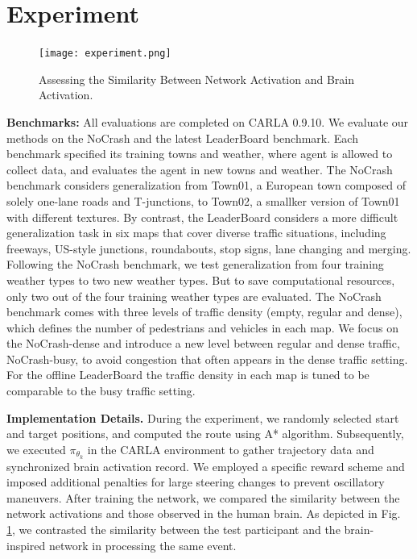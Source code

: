 \section{Experiment}
\begin{figure}[t]
	\centering
	\texttt{[image: experiment.png]}
	
	\caption{Assessing the Similarity Between Network Activation and Brain Activation.}
	\label{fig:fig3}
\end{figure}
\label{sec:experiment}

\textbf{\textsf{Benchmarks:}}
All evaluations are completed on CARLA 0.9.10. 
We evaluate our methods on the NoCrash\cite{codevilla2019exploring} and the latest LeaderBoard  benchmark.
Each benchmark specified its training towns and weather, where agent is allowed to collect data, and evaluates the agent in new towns and weather.
The NoCrash benchmark considers generalization from Town01, a European town composed of solely one-lane roads and T-junctions, to Town02, a smallker version of Town01 with different textures.
By contrast, the LeaderBoard considers a more difficult generalization task in six maps that cover diverse traffic situations, including freeways, US-style junctions, roundabouts, stop signs, lane changing and merging.
Following the NoCrash benchmark, we test generalization from four training weather types to two new weather types.
But to save computational resources, only two out of the four training weather types are evaluated.
The NoCrash benchmark comes with three levels of traffic density (empty, regular and dense), which defines the number of pedestrians and vehicles in each map.
We focus on the NoCrash-dense and introduce a new level between regular and dense traffic, NoCrash-busy, to avoid congestion that often appears in the dense traffic setting.
For the offline LeaderBoard the traffic density in each map is tuned to be comparable to the busy traffic setting. 



\textbf{\textsf{Implementation Details.}} During the experiment, we randomly selected start and target positions, and computed the route using A* algorithm. Subsequently, we executed $\pi_{\theta_{k}}$ in the CARLA \cite{Dosovitskiy17} environment to gather trajectory data and synchronized brain activation record. We employed a specific reward scheme and imposed additional penalties for large steering changes to prevent oscillatory maneuvers. After training the network, we compared the similarity between the network activations and those observed in the human brain. As depicted in Fig. \ref{fig:fig3}, we contrasted the similarity between the test participant and the brain-inspired network in processing the same event.

